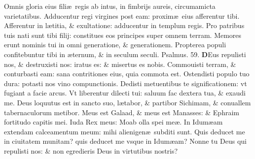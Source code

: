 \documentclass[a5paper,10pt]{book}
\def\ae{æ}
\begin{document}
\begin{multicols*}{2}
\newline \color{red} O\color{black}mnis gloria eius fili\ae \ regis ab intus, in fimbrijs aureis, circumamicta varietatibus.
\newline \color{red} A\color{black}dducentur regi virgines post eam: proxim\ae \ eius afferentur tibi.
\newline \color{red} A\color{black}fferentur in l\ae titia, \& exultatione: adducentur in templum regis.
\newline \color{red} P\color{black}ro patribus tuis nati sunt tibi filij: constitues eos principes super omnem terram.
\newline \color{red} M\color{black}emores erunt nominis tui in omni generatione, \& generationem.
\newline \color{red} P\color{black}ropterea populi confitebuntur tibi in \ae ternum, \& in seculum seculi.
\newline \color{red} Psalmus. \hypertarget{ps59}{59.} \color{black}
\vspace{-.5em}
\lettrine[lines=2]{\bfseries \color{red} D}{}Eus repulisti nos, \& destruxisti nos: iratus es: \& misertus es nobis.
\newline \color{red} C\color{black}ommouisti terram, \& conturbasti eam: sana contritiones eius, quia commota est.
\newline \color{red} O\color{black}stendisti populo tuo dura: potasti nos vino compunctionis.
\newline \color{red} D\color{black}edisti metuentibus te significationem: vt fugiant a facie arcus.
\newline \color{red} V\color{black}t liberentur dilecti tui: saluum fac dextera tua, \& exaudi me.
\newline \color{red} D\color{black}eus loquutus est in sancto suo, l\ae tabor, \& partibor Sichimam, \& conuallem tabernaculorum metibor.
\newline \color{red} M\color{black}eus est Galaad, \& meus est Manasses: \& Ephraim fortitudo capitis mei.
\newline \color{red} I\color{black}uda Rex meus: Moab olla spei me\ae .
\newline \color{red} I\color{black}n Idum\ae am extendam calceamentum meum: mihi alienigen\ae \ subditi sunt.
\newline \color{red} Q\color{black}uis deducet me in ciuitatem munitam? quis deducet me vsque in Idum\ae am?
\newline \color{red} N\color{black}onne tu Deus qui repulisti nos: \& non egredieris Deus in virtutibus nostris?

\end{multicols*}
\end{document}

